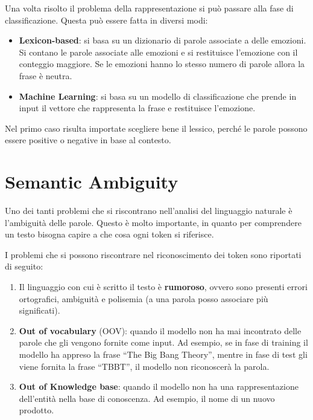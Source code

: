 Una volta risolto il problema della rappresentazione si può passare alla fase
di classificazione. Questa può essere fatta in diversi modi:
\begin{itemize}
      \item \textbf{Lexicon-based}: si basa su un dizionario di parole associate
            a delle emozioni. Si contano le parole associate alle emozioni e si
            restituisce l'emozione con il conteggio maggiore. Se le emozioni hanno
            lo stesso numero di parole allora la frase è neutra.
      \item \textbf{Machine Learning}: si basa su un modello di classificazione
            che prende in input il vettore che rappresenta la frase e restituisce
            l'emozione.
\end{itemize}
\begin{nota}
      Nel primo caso risulta importate scegliere bene il lessico, perché le parole
      possono essere positive o negative in base al contesto.
\end{nota}
\section{Semantic Ambiguity}
Uno dei tanti problemi che si riscontrano nell'analisi del linguaggio naturale
è l'ambiguità delle parole. Questo è molto importante, in quanto per comprendere
un testo bisogna capire a che cosa ogni token si riferisce.

I problemi che si possono riscontrare nel riconoscimento dei token sono riportati
di seguito:
\begin{enumerate}
      \item Il linguaggio con cui è scritto il testo è \textbf{rumoroso}, ovvero
            sono presenti errori ortografici, ambiguità e polisemia (a una parola
            posso associare più significati).
      \item \textbf{Out of vocabulary} (OOV): quando il modello non ha mai
            incontrato delle parole che gli vengono fornite come input. Ad esempio,
            se in fase di training il modello ha appreso la frase ``The Big Bang
            Theory'', mentre in fase di test gli viene fornita la frase ``TBBT'',
            il modello non riconoscerà la parola.
      \item \textbf{Out of Knowledge base}: quando il modello non ha una
            rappresentazione dell'entità nella base di conoscenza. Ad esempio,
            il nome di un nuovo prodotto.
\end{enumerate}

